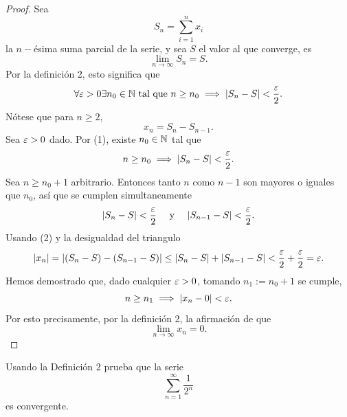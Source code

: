 \documentclass[12pt,a4paper]{article}
\begin{document}
    \begin{proof}
        Sea
        \begin{equation*}
            S_{n}=\sum_{i=1}^{n}x_{i}
        \end{equation*}
        la $n-$ésima suma parcial de la serie, y sea $S$ el valor al que converge, es
        \begin{equation*}
            \lim_{n\to\infty}S_{n}=S.
        \end{equation*}
        Por la definición 2, esto significa que
        \begin{equation}
            \forall\varepsilon>0\exists n_{0}\in\mathbb{N}\text{ tal que }n\geq n_{0}\implies\abs{S_{n}-S}<\frac{\varepsilon}{2}.
        \end{equation}
        Nótese que para $n\geq2$,
        \begin{equation}
            x_{n}=S_{n}-S_{n-1}.
        \end{equation}
        Sea $\varepsilon>0$ dado. Por (1), existe $n_{0}\in\mathbb{N}$ tal que
        \begin{equation*}
            n\geq n_{0}\implies\abs{S_{n}-S}<\frac{\varepsilon}{2}.
        \end{equation*}
        Sea $n\geq n_{0}+1$ arbitrario. Entonces tanto $n$ como $n-1$ son
        mayores o iguales que $n_{0}$, así que se cumplen simultaneamente
        \begin{equation*}
            \abs{S_{n}-S}<\frac{\varepsilon}{2}\quad\text{ y }\quad\abs{S_{n-1}-S}<\frac{\varepsilon}{2}.
        \end{equation*}
        Usando (2) y la desigualdad del triangulo
        \begin{equation*}
            \abs{x_{n}}=\abs{(S_{n}-S)-(S_{n-1}-S)}\leq\abs{S_{n}-S}+\abs{S_{n-1}-S}<\frac{\varepsilon}{2}+\frac{\varepsilon}{2}=\varepsilon.
        \end{equation*}
        Hemos demostrado que, dado cualquier $\varepsilon>0$, tomando $n_{1}:=n_{0}+1$ se cumple,
        \begin{equation*}
            n\geq n_{1}\implies \abs{x_{n}-0}<\varepsilon.
        \end{equation*}
        Por esto precisamente, por la definición 2, la afirmación de que
        \begin{equation*}
            \lim_{n\to\infty}x_{n}=0.
        \end{equation*}
    \end{proof}

    \begin{ejercicio}
        Usando la Definición 2 prueba que la serie
        \begin{equation*}
            \sum_{n=1}^{\infty}\frac{1}{2^{n}}
        \end{equation*}
        es convergente.
    \end{ejercicio}
\end{document}
